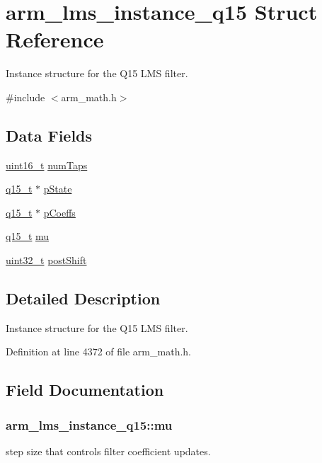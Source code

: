 \hypertarget{structarm__lms__instance__q15}{\section{arm\-\_\-lms\-\_\-instance\-\_\-q15 Struct Reference}
\label{structarm__lms__instance__q15}
}


Instance structure for the Q15 L\-M\-S filter.  




{\ttfamily \#include $<$arm\-\_\-math.\-h$>$}

\subsection*{Data Fields}
\begin{DoxyCompactItemize}
\item 
\hyperlink{stdint_8h_a273cf69d639a59973b6019625df33e30}{uint16\-\_\-t} \hyperlink{structarm__lms__instance__q15_a0078e894f805af1b360369e619fb57b3}{num\-Taps}
\item 
\hyperlink{arm__math_8h_ab5a8fb21a5b3b983d5f54f31614052ea}{q15\-\_\-t} $\ast$ \hyperlink{structarm__lms__instance__q15_a9a575ff82c1e68cbb583083439260d08}{p\-State}
\item 
\hyperlink{arm__math_8h_ab5a8fb21a5b3b983d5f54f31614052ea}{q15\-\_\-t} $\ast$ \hyperlink{structarm__lms__instance__q15_a42f95368b94898eb82608e1113d18cab}{p\-Coeffs}
\item 
\hyperlink{arm__math_8h_ab5a8fb21a5b3b983d5f54f31614052ea}{q15\-\_\-t} \hyperlink{structarm__lms__instance__q15_aae46129d7cfd7f1c162cc502ed0a9d49}{mu}
\item 
\hyperlink{stdint_8h_a435d1572bf3f880d55459d9805097f62}{uint32\-\_\-t} \hyperlink{structarm__lms__instance__q15_acca5fbaef4a52ae411de24c9a0b929cf}{post\-Shift}
\end{DoxyCompactItemize}


\subsection{Detailed Description}
Instance structure for the Q15 L\-M\-S filter. 

Definition at line 4372 of file arm\-\_\-math.\-h.



\subsection{Field Documentation}
\hypertarget{structarm__lms__instance__q15_aae46129d7cfd7f1c162cc502ed0a9d49}{
\subsubsection[{mu}]{ arm\-\_\-lms\-\_\-instance\-\_\-q15\-::mu}}\label{structarm__lms__instance__q15_aae46129d7cfd7f1c162cc502ed0a9d49}
step size that controls filter coefficient updates. 


